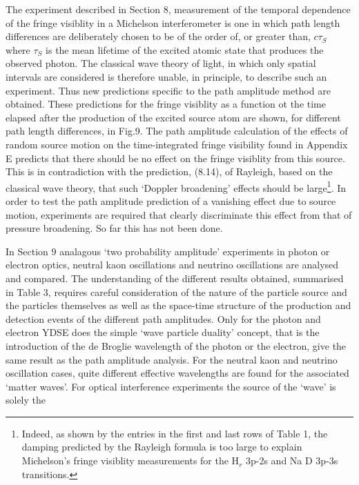 \documentclass [12pt]{article}
\begin{document}
{  \par The experiment described in Section 8, measurement of the temporal dependence of the
   fringe visiblity in a Michelson interferometer is one in which path length differences
  are deliberately chosen to be of the order of, or greater than, $c \tau_S$ where 
   $\tau_S$ is the mean lifetime of the excited atomic state that produces the observed
  photon. The classical wave theory of light, in which only spatial intervals are considered
  is therefore unable, in principle, to describe such an experiment. Thus new predictions
  specific to the path amplitude method are obtained. These predictions for the fringe visiblity
  as a function ot the time elapsed after the production of the excited source atom are shown,
   for different path length differences, in Fig.9. The path amplitude calculation of the
  effects of random source motion on the time-integrated fringe visibility found in Appendix E predicts
  that there should be no effect on the fringe visiblity from this source. This is in contradiction
  with the prediction, (8.14), of Rayleigh, based on the classical wave theory, that such
  `Doppler broadening' effects should be large\footnote{Indeed, as shown by the entries in the 
   first and last rows of Table 1, the damping predicted by the Rayleigh formula
   is too large to explain Michelson's fringe visiblity measurements for the H$_r$ 3p-2s
    and  Na D 3p-3s transitions.}. In order to test the path amplitude prediction of a
   vanishing effect due
  to source motion, experiments are required that clearly discriminate this effect from
  that of pressure broadening. So far this has not been done.
  \par In Section 9 analagous `two probability amplitude' experiments in photon or electron
  optics, neutral kaon oscillations and neutrino oscillations are analysed and compared. 
  The understanding of the different results obtained, summarised in Table 3, requires 
  careful consideration of the nature of the particle source and the particles 
   themselves as well as the space-time 
  structure of the production and detection events of the different path amplitudes.
  Only for the photon and electron YDSE does the simple
  `wave particle duality' concept, that is the introduction of the de Broglie
   wavelength of the photon or the electron, give the same result as the path 
   amplitude analysis. For the neutral kaon and neutrino oscillation cases, quite
   different effective wavelengths are found for the associated `matter waves'.
   For  optical interference experiments the source of the `wave' is solely the
}
\end{document}
